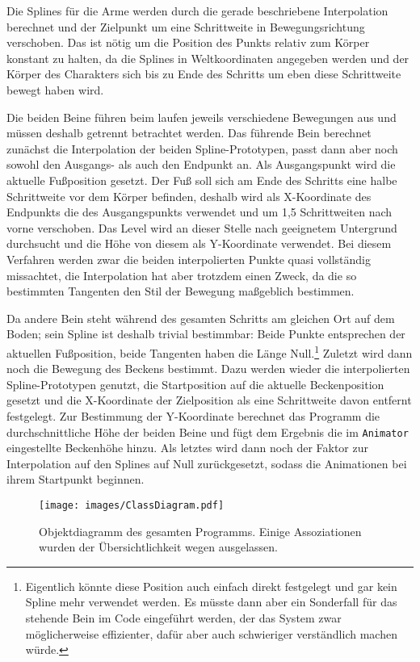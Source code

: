 Die Splines für die Arme werden durch die gerade beschriebene Interpolation berechnet und der Zielpunkt um eine Schrittweite in Bewegungsrichtung verschoben. Das ist nötig um die Position des Punkts relativ zum Körper konstant zu halten, da die Splines in Weltkoordinaten angegeben werden und der Körper des Charakters sich bis zu Ende des Schritts um eben diese Schrittweite bewegt haben wird.

Die beiden Beine führen beim laufen jeweils verschiedene Bewegungen aus und müssen deshalb getrennt betrachtet werden. Das führende Bein berechnet zunächst die Interpolation der beiden Spline-Prototypen, passt dann aber noch sowohl den Ausgangs- als auch den Endpunkt an. Als Ausgangspunkt wird die aktuelle Fußposition gesetzt. Der Fuß soll sich am Ende des Schritts eine halbe Schrittweite vor dem Körper befinden, deshalb wird als X-Koordinate des Endpunkts die des Ausgangspunkts verwendet und um 1,5 Schrittweiten nach vorne verschoben. Das Level wird an dieser Stelle nach geeignetem Untergrund durchsucht und die Höhe von diesem als Y-Koordinate verwendet. Bei diesem Verfahren werden zwar die beiden interpolierten Punkte quasi vollständig missachtet, die Interpolation hat aber trotzdem einen Zweck, da die so bestimmten Tangenten den Stil der Bewegung maßgeblich bestimmen.

Da andere Bein steht während des gesamten Schritts am gleichen Ort auf dem Boden; sein Spline ist deshalb trivial bestimmbar: Beide Punkte entsprechen der aktuellen Fußposition, beide Tangenten haben die Länge Null.\footnote{Eigentlich könnte diese Position auch einfach direkt festgelegt und gar kein Spline mehr verwendet werden. Es müsste dann aber ein Sonderfall für das stehende Bein im Code eingeführt werden, der das System zwar möglicherweise effizienter, dafür aber auch schwieriger verständlich machen würde.} Zuletzt wird dann noch die Bewegung des Beckens bestimmt. Dazu werden wieder die interpolierten Spline-Prototypen genutzt, die Startposition auf die aktuelle Beckenposition gesetzt und die X-Koordinate der Zielposition als eine Schrittweite davon entfernt festgelegt. Zur Bestimmung der Y-Koordinate berechnet das Programm die durchschnittliche Höhe der beiden Beine und fügt dem Ergebnis die im \lstinline{Animator} eingestellte Beckenhöhe hinzu. Als letztes wird dann noch der Faktor zur Interpolation auf den Splines auf Null zurückgesetzt, sodass die Animationen bei ihrem Startpunkt beginnen.



\begin{landscape}
    \begin{figure}
        \texttt{[image: images/ClassDiagram.pdf]}
        \caption{Objektdiagramm des gesamten Programms. Einige Assoziationen wurden der Übersichtlichkeit wegen ausgelassen.}
        \label{uml_classes}
    \end{figure}
\end{landscape}

